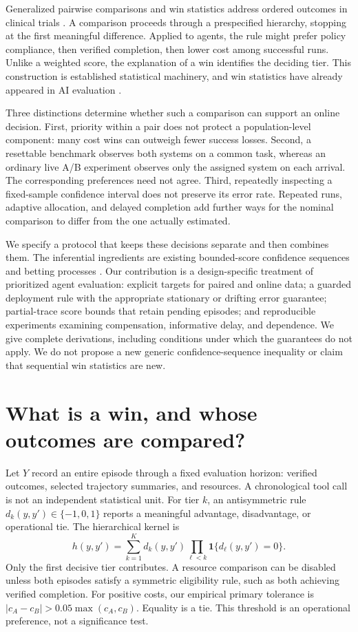 \documentclass{article}
\newcommand{\ind}{\mathbf 1}
\begin{document}
Generalized pairwise comparisons and win statistics address ordered
outcomes in clinical trials \citep{buyse2010generalized,pocock2012win}.
A comparison proceeds through a prespecified hierarchy, stopping at the
first meaningful difference. Applied to agents, the rule might prefer
policy compliance, then verified completion, then lower cost among
successful runs. Unlike a weighted score, the explanation of a win
identifies the deciding tier. This construction is established statistical
machinery, and win statistics have already appeared in AI evaluation
\citep{realpocqi2026}.

Three distinctions determine whether such a comparison can support an
online decision. First, priority within a pair does not protect a
population-level component: many cost wins can outweigh fewer success
losses. Second, a resettable benchmark observes both systems on a common
task, whereas an ordinary live A/B experiment observes only the assigned
system on each arrival. The corresponding preferences need not agree.
Third, repeatedly inspecting a fixed-sample confidence interval does not
preserve its error rate. Repeated runs, adaptive allocation, and delayed
completion add further ways for the nominal comparison to differ from the
one actually estimated.

We specify a protocol that keeps these decisions separate and then
combines them. The inferential ingredients are existing bounded-score
confidence sequences and betting processes
\citep{howard2021confidence,waudbysmith2024betting}. Our contribution is a
design-specific treatment of prioritized agent evaluation: explicit
targets for paired and online data; a guarded deployment rule with the
appropriate stationary or drifting error guarantee; partial-trace score bounds that retain pending episodes; and reproducible
experiments examining compensation, informative delay, and dependence. We give
complete derivations, including conditions under which the guarantees do
not apply. We do not propose a new generic confidence-sequence inequality
or claim that sequential win statistics are new.

\section{What is a win, and whose outcomes are compared?}
\label{sec:estimands}
Let $Y$ record an entire episode through a fixed evaluation horizon:
verified outcomes, selected trajectory summaries, and resources. A
chronological tool call is not an independent statistical unit. For tier
$k$, an antisymmetric rule $d_k(y,y')\in\{-1,0,1\}$ reports a meaningful
advantage, disadvantage, or operational tie. The hierarchical kernel is
\begin{equation}
 h(y,y')=\sum_{k=1}^{K}d_k(y,y')\prod_{\ell<k}
             \ind\{d_\ell(y,y')=0\}.
 \label{eq:main_kernel}
\end{equation}
Only the first decisive tier contributes. A resource comparison can be
disabled unless both episodes satisfy a symmetric eligibility rule, such
as both achieving verified completion. For positive costs, our empirical
primary tolerance is $|c_A-c_B|>0.05\max(c_A,c_B)$. Equality is a tie.
This threshold is an operational preference, not a significance test.
\end{document}
